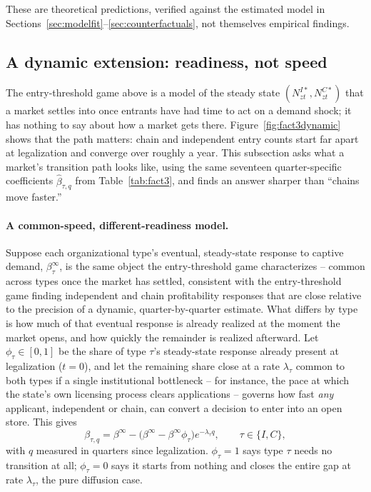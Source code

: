 \documentclass[english,12pt]{article}
\begin{document}
These are theoretical predictions, verified against the estimated model in Sections~\ref{sec:modelfit}--\ref{sec:counterfactuals}, not themselves empirical findings.

\subsection{A dynamic extension: readiness, not speed}
\label{sec:diffusion}

The entry-threshold game above is a model of the steady state $(N^{I*}_{zt}, N^{C*}_{zt})$ that a market settles into once entrants have had time to act on a demand shock; it has nothing to say about how a market gets there. Figure~\ref{fig:fact3dynamic} shows that the path matters: chain and independent entry counts start far apart at legalization and converge over roughly a year. This subsection asks what a market's transition path looks like, using the same seventeen quarter-specific coefficients $\hat\beta_{\tau,q}$ from Table~\ref{tab:fact3}, and finds an answer sharper than ``chains move faster.''

\paragraph{A common-speed, different-readiness model.} Suppose each organizational type's eventual, steady-state response to captive demand, $\beta_\tau^\infty$, is the same object the entry-threshold game characterizes -- common across types once the market has settled, consistent with the entry-threshold game finding independent and chain profitability responses that are close relative to the precision of a dynamic, quarter-by-quarter estimate. What differs by type is how much of that eventual response is already realized at the moment the market opens, and how quickly the remainder is realized afterward. Let $\phi_\tau\in[0,1]$ be the share of type $\tau$'s steady-state response already present at legalization ($t=0$), and let the remaining share close at a rate $\lambda_\tau$ common to both types if a single institutional bottleneck -- for instance, the pace at which the state's own licensing process clears applications -- governs how fast \emph{any} applicant, independent or chain, can convert a decision to enter into an open store. This gives
\begin{equation}
\label{eq:diffusion}
\beta_{\tau,q} = \beta^\infty - \big(\beta^\infty - \beta^\infty\phi_\tau\big)e^{-\lambda_\tau q}, \qquad \tau\in\{I,C\},
\end{equation}
with $q$ measured in quarters since legalization. $\phi_\tau=1$ says type $\tau$ needs no transition at all; $\phi_\tau=0$ says it starts from nothing and closes the entire gap at rate $\lambda_\tau$, the pure diffusion case.
\end{document}
